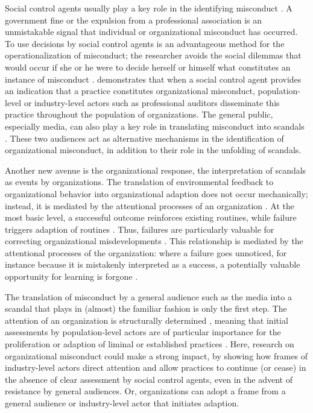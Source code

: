 Social control agents usually play a key role in the identifying misconduct \citep{Greve2010, Palmer2008, Schnatterly2018}. A government fine or the expulsion from a professional association is an unmistakable signal that individual or organizational misconduct has occurred. To use decisions by social control agents is an advantageous method for the operationalization of misconduct; the researcher avoids the social dilemmas that would occur if she or he were to decide herself or himself what constitutes an instance of misconduct \citep[e.g.,][]{Pontikes2010}. \citet{Mohliver2019} demonstrates that when a social control agent provides an indication that a practice constitutes organizational misconduct, population-level or industry-level actors \citep{Madsen2018} such as professional auditors disseminate this practice throughout the population of organizations. The general public, especially media, can also play a key role in translating misconduct into scandals \citet{Piazza2018, Hoffman1999}. These two audiences act as alternative mechanisms in the identification of organizational misconduct, in addition to their role in the unfolding of scandals.

Another new avenue is the organizational response, the interpretation of scandals as events by organizations. The translation of environmental feedback to organizational behavior into organizational adaption \citep{Cyert1963} does not occur mechanically; instead, it is mediated by the attentional processes of an organization \citep{Hoffman2001, Ocasio1997}. At the most basic level, a successful outcome reinforces existing routines, while failure triggers adaption of routines \citep{Levitt1988}. Thus, failures are particularly valuable for correcting organizational misdevelopments \citep{March1992}. This relationship is mediated by the attentional processes of the organization: where a failure goes unnoticed, for instance because it is mistakenly interpreted as a success, a potentially valuable opportunity for learning \citep{Carroll1998} is forgone \citep{Dillon2008}.

The translation of misconduct by a general audience such as the media into a scandal that plays in (almost) the familiar fashion is only the first step. The attention of an organization is structurally determined \citep{Hoffman2001}, meaning that initial assessments by population-level actors are of particular importance for the proliferation or adaption of liminal or established practices \citep{Mohliver2019, Madsen2018}. Here, research on organizational misconduct could make a strong impact, by showing how frames of industry-level actors direct attention and allow practices to continue (or cease) in the absence of clear assessment by social control agents, even in the advent of resistance by general audiences. Or, organizations can adopt a frame from a general audience or industry-level actor that initiates adaption.